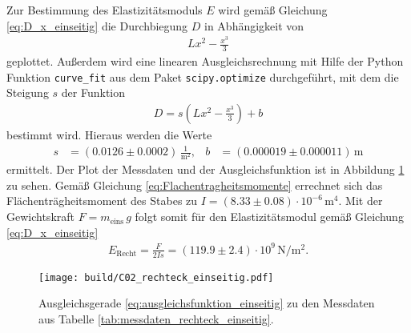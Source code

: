 \noindent
Zur Bestimmung des Elastizitätsmoduls $E$ wird gemäß Gleichung \eqref{eq:D_x_einseitig} die Durchbiegung $D$ in Abhängigkeit von 
\begin{align*}
    L x^2 - \frac{x^3}{3}
\end{align*}
geplottet.
Außerdem wird eine linearen Ausgleichsrechnung mit Hilfe der Python \cite[]{python} Funktion \texttt{curve\_fit} aus dem Paket
\texttt{scipy.optimize} \cite[]{scipy} durchgeführt, mit dem die Steigung $s$ der Funktion 
\begin{align}
    D = s \left(L x^2 - \frac{x^3}{3}\right) + b
    \label{eq:ausgleichsfunktion_einseitig}
\end{align}
bestimmt wird.
Hieraus werden die Werte 
\begin{align*}
    s &= (\num{0.0126} \pm \num{0.0002}) \, \frac{1}{\unit{\meter^2}}, & b &= (\num{0.000019} \pm \num{0.000011}) \, \unit{\meter}
\end{align*}
ermittelt.
Der Plot der Messdaten und der Ausgleichsfunktion ist in Abbildung \ref{fig:plot_rechteck_einseitig} zu sehen.
Gemäß Gleichung \eqref{eq:Flachentragheitsmomente} errechnet sich das Flächenträgheitsmoment des Stabes zu 
$I = (\num{8.33} \pm \num{0.08}) \cdot 10^{-6} \, \unit{\meter^4}$.
Mit der Gewichtskraft $F = m_\text{eins} \, g$ folgt somit für den Elastizitätsmodul gemäß Gleichung \eqref{eq:D_x_einseitig}
\begin{align}
    E_\text{Recht} = \frac{F}{2 I s} = (\num{119.9} \pm \num{2.4}) \cdot 10^9 \, \unit{\newton\per\meter^2}.
\end{align}

\begin{figure}[H]
    \centering
    \texttt{[image: build/C02\_rechteck\_einseitig.pdf]}
    \caption{Ausgleichsgerade \eqref{eq:ausgleichsfunktion_einseitig} zu den Messdaten aus Tabelle \ref{tab:messdaten_rechteck_einseitig}.}
    \label{fig:plot_rechteck_einseitig}
\end{figure}